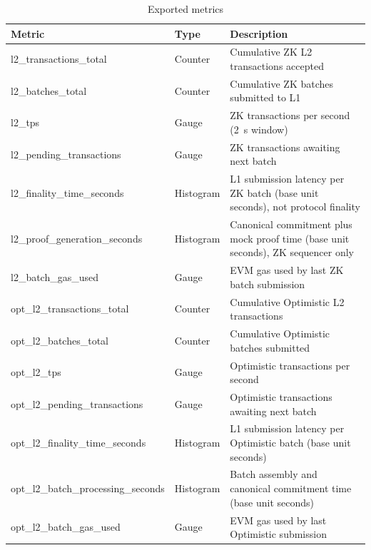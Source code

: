 \begin{table}[htbp]
\centering
\footnotesize
\setlength{\tabcolsep}{3pt}
\renewcommand{\arraystretch}{1.08}
\begin{tabular}{@{}>{\raggedright\arraybackslash\ttfamily}p{5.2cm}|>{\raggedright\arraybackslash}p{2.0cm}|>{\raggedright\arraybackslash}p{6.4cm}@{}}
\hline
\normalfont\textbf{Metric} & \textbf{Type} & \textbf{Description} \\
\hline
l2\_\allowbreak transactions\_\allowbreak total & Counter & Cumulative ZK L2 transactions accepted \\
l2\_\allowbreak batches\_\allowbreak total & Counter & Cumulative ZK batches submitted to L1 \\
l2\_\allowbreak tps & Gauge & ZK transactions per second (2~s window) \\
l2\_\allowbreak pending\_\allowbreak transactions & Gauge & ZK transactions awaiting next batch \\
l2\_\allowbreak finality\_\allowbreak time\_\allowbreak seconds & Histogram & L1 submission latency per ZK batch (base unit seconds), not protocol finality \\
l2\_\allowbreak proof\_\allowbreak generation\_\allowbreak seconds & Histogram & Canonical commitment plus mock proof time (base unit seconds), ZK sequencer only \\
l2\_\allowbreak batch\_\allowbreak gas\_\allowbreak used & Gauge & EVM gas used by last ZK batch submission \\
\hline
opt\_\allowbreak l2\_\allowbreak transactions\_\allowbreak total & Counter & Cumulative Optimistic L2 transactions \\
opt\_\allowbreak l2\_\allowbreak batches\_\allowbreak total & Counter & Cumulative Optimistic batches submitted \\
opt\_\allowbreak l2\_\allowbreak tps & Gauge & Optimistic transactions per second \\
opt\_\allowbreak l2\_\allowbreak pending\_\allowbreak transactions & Gauge & Optimistic transactions awaiting next batch \\
opt\_\allowbreak l2\_\allowbreak finality\_\allowbreak time\_\allowbreak seconds & Histogram & L1 submission latency per Optimistic batch (base unit seconds) \\
opt\_\allowbreak l2\_\allowbreak batch\_\allowbreak processing\_\allowbreak seconds & Histogram & Batch assembly and canonical commitment time (base unit seconds) \\
opt\_\allowbreak l2\_\allowbreak batch\_\allowbreak gas\_\allowbreak used & Gauge & EVM gas used by last Optimistic submission \\
\hline
\end{tabular}
\caption{Exported metrics}
\label{tab:metrics-list}
\end{table}

